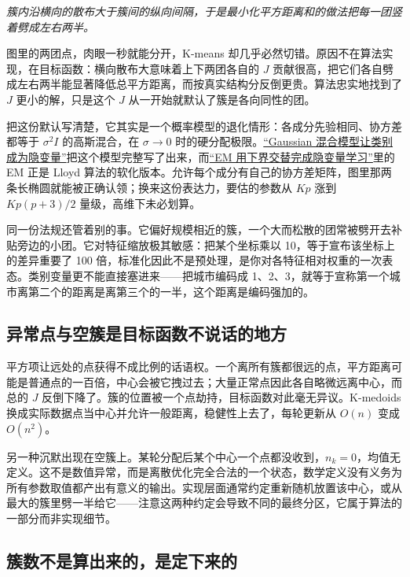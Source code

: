 \emph{簇内沿横向的散布大于簇间的纵向间隔，于是最小化平方距离和的做法把每一团竖着劈成左右两半。}

图里的两团点，肉眼一秒就能分开，K-means 却几乎必然切错。原因不在算法实现，在目标函数：横向散布大意味着上下两团各自的 \(J\) 贡献很高，把它们各自劈成左右两半能显著降低总平方距离，而按真实结构分反倒更贵。算法忠实地找到了 \(J\) 更小的解，只是这个 \(J\) 从一开始就默认了簇是各向同性的团。

把这份默认写清楚，它其实是一个概率模型的退化情形：各成分先验相同、协方差都等于 \(\sigma^2 I\) 的高斯混合，在 \(\sigma\to0\) 时的硬分配极限。\hyperref[sec:13-Machine-Learning/06-Probabilistic-Models/03]{``Gaussian 混合模型让类别成为隐变量''}把这个模型完整写了出来，而\hyperref[sec:13-Machine-Learning/06-Probabilistic-Models/04]{``EM 用下界交替完成隐变量学习''}里的 EM 正是 Lloyd 算法的软化版本。允许每个成分有自己的协方差矩阵，图里那两条长椭圆就能被正确认领；换来这份表达力，要估的参数从 \(Kp\) 涨到 \(Kp(p+3)/2\) 量级，高维下未必划算。

同一份法规还管着别的事。它偏好规模相近的簇，一个大而松散的团常被劈开去补贴旁边的小团。它对特征缩放极其敏感：把某个坐标乘以 10，等于宣布该坐标上的差异重要了 100 倍，标准化因此不是预处理，是你对各特征相对权重的一次表态。类别变量更不能直接塞进来——把城市编码成 1、2、3，就等于宣称第一个城市离第二个的距离是离第三个的一半，这个距离是编码强加的。

\subsection{异常点与空簇是目标函数不说话的地方}

平方项让远处的点获得不成比例的话语权。一个离所有簇都很远的点，平方距离可能是普通点的一百倍，中心会被它拽过去；大量正常点因此各自略微远离中心，而总的 \(J\) 反倒下降了。簇的位置被一个点劫持，目标函数对此毫无异议。K-medoids 换成实际数据点当中心并允许一般距离，稳健性上去了，每轮更新从 \(O(n)\) 变成 \(O(n^2)\)。

另一种沉默出现在空簇上。某轮分配后某个中心一个点都没收到，\(n_k=0\)，均值无定义。这不是数值异常，而是离散优化完全合法的一个状态，数学定义没有义务为所有参数取值都产出有意义的输出。实现层面通常约定重新随机放置该中心，或从最大的簇里劈一半给它——注意这两种约定会导致不同的最终分区，它属于算法的一部分而非实现细节。

\subsection{簇数不是算出来的，是定下来的}

